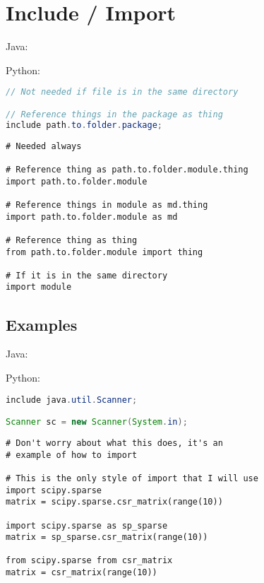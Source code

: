 \documentclass{article}
\begin{document}
\section{Include / Import}
\begin{minipage}{0.45\linewidth}
    Java:
\end{minipage}
\hfill
\begin{minipage}{0.45\linewidth}
    Python:
\end{minipage}

\begin{minipage}{0.45\linewidth}
    \begin{lstlisting}[language=Java]
// Not needed if file is in the same directory

// Reference things in the package as thing
include path.to.folder.package;
    \end{lstlisting}
\end{minipage}
\hfill
\begin{minipage}{0.45\linewidth}
    \begin{lstlisting}
# Needed always

# Reference thing as path.to.folder.module.thing
import path.to.folder.module

# Reference things in module as md.thing
import path.to.folder.module as md

# Reference thing as thing
from path.to.folder.module import thing

# If it is in the same directory
import module
    \end{lstlisting}
\end{minipage}

\subsection{Examples}
\begin{minipage}{0.45\linewidth}
    Java:
\end{minipage}
\hfill
\begin{minipage}{0.45\linewidth}
    Python:
\end{minipage}

\begin{minipage}{0.45\linewidth}
    \begin{lstlisting}[language=Java]
include java.util.Scanner;

Scanner sc = new Scanner(System.in);
    \end{lstlisting}
\end{minipage}
\hfill
\begin{minipage}{0.45\linewidth}
    \begin{lstlisting}
# Don't worry about what this does, it's an
# example of how to import

# This is the only style of import that I will use
import scipy.sparse
matrix = scipy.sparse.csr_matrix(range(10))

import scipy.sparse as sp_sparse
matrix = sp_sparse.csr_matrix(range(10))

from scipy.sparse from csr_matrix
matrix = csr_matrix(range(10))
    \end{lstlisting}
\end{minipage}
\end{document}
